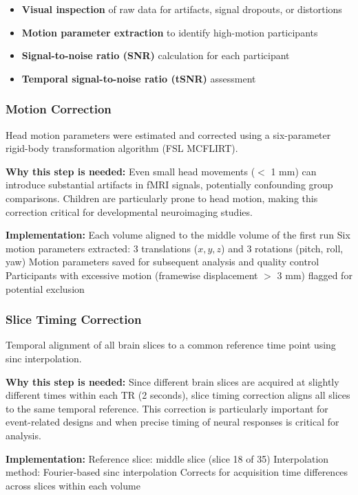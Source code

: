 \begin{itemize}
\item \textbf{Visual inspection} of raw data for artifacts, signal dropouts, or distortions
\item \textbf{Motion parameter extraction} to identify high-motion participants
\item \textbf{Signal-to-noise ratio (SNR)} calculation for each participant
\item \textbf{Temporal signal-to-noise ratio (tSNR)} assessment
\end{itemize}


\subsubsection{Motion Correction}
Head motion parameters were estimated and corrected using a six-parameter rigid-body transformation algorithm (FSL MCFLIRT).

\noindent
\textbf{Why this step is needed:} Even small head movements ($<$ 1 mm) can introduce substantial artifacts in fMRI signals, potentially confounding group comparisons. Children are particularly prone to head motion, making this correction critical for developmental neuroimaging studies.

\noindent
\textbf{Implementation:} Each volume aligned to the middle volume of the first run
Six motion parameters extracted: 3 translations ($x, y, z$) and 3 rotations (pitch, roll, yaw)
Motion parameters saved for subsequent analysis and quality control
Participants with excessive motion (framewise displacement $>$ 3 mm) flagged for potential exclusion


\subsubsection{Slice Timing Correction}
Temporal alignment of all brain slices to a common reference time point using sinc interpolation.

\noindent
\textbf{Why this step is needed:} Since different brain slices are acquired at slightly different times within each TR (2 seconds), slice timing correction aligns all slices to the same temporal reference. This correction is particularly important for event-related designs and when precise timing of neural responses is critical for analysis.

\noindent
\textbf{Implementation:} Reference slice: middle slice (slice 18 of 35)
Interpolation method: Fourier-based sinc interpolation
Corrects for acquisition time differences across slices within each volume

